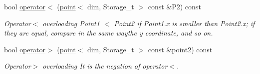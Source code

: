 \begin{DoxyCompactItemize}
\item 
\hypertarget{classBGLgeom_1_1point_a8749423a67874d0d2c72f216d0a8c0ad}{
bool \hyperlink{classBGLgeom_1_1point_a8749423a67874d0d2c72f216d0a8c0ad}{operator$<$} (\hyperlink{classBGLgeom_1_1point}{point}$<$ dim, Storage\_\-t $>$ const \&P2) const }
\label{classBGLgeom_1_1point_a8749423a67874d0d2c72f216d0a8c0ad}

\begin{DoxyCompactList}\small\item\em Operator$<$ overloading  Point1 $<$ Point2 if Point1.x is smaller than Point2.x; if they are equal, compare in the same waythe y coordinate, and so on. \item\end{DoxyCompactList}\item 
\hypertarget{classBGLgeom_1_1point_a3a69c08ed08755391913af9d35cabd2d}{
bool \hyperlink{classBGLgeom_1_1point_a3a69c08ed08755391913af9d35cabd2d}{operator$>$} (\hyperlink{classBGLgeom_1_1point}{point}$<$ dim, Storage\_\-t $>$ const \&point2) const }
\label{classBGLgeom_1_1point_a3a69c08ed08755391913af9d35cabd2d}

\begin{DoxyCompactList}\small\item\em Operator$>$ overloading  It is the negation of operator$<$. \item\end{DoxyCompactList}\end{DoxyCompactItemize}
